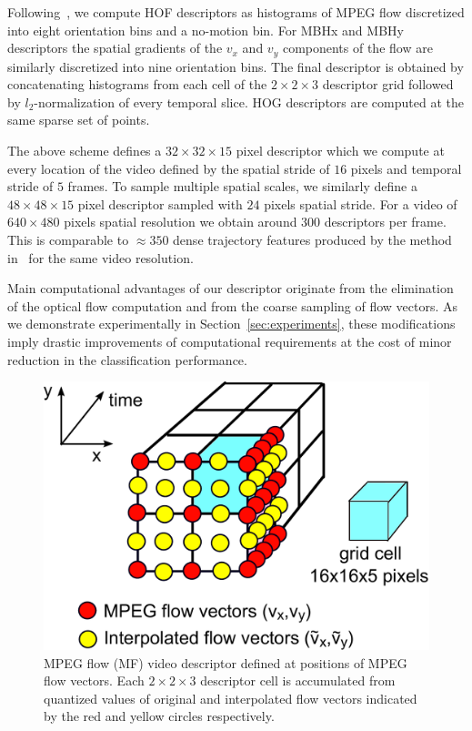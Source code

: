Following~\cite{Wang12}, we compute HOF descriptors as histograms of MPEG flow discretized into eight orientation bins and a no-motion bin. For MBHx and MBHy descriptors the spatial gradients of the $v_x$ and $v_y$ components of the flow are similarly discretized into nine orientation bins. %
The final descriptor is obtained by concatenating histograms from each cell of the $2\times2\times3$ descriptor grid followed by $l_2$-normalization of every temporal slice. HOG descriptors are computed at the same sparse set of points.

The above scheme defines a $32\times32\times15$ pixel descriptor which we compute at every location of the video defined by the spatial stride of $16$ pixels and temporal stride of $5$ frames. To sample multiple spatial scales, we similarly define a $48\times48\times15$ pixel descriptor sampled with $24$ pixels spatial stride. For a video of $640\times480$ pixels spatial resolution we obtain around 300 descriptors per frame. This is comparable to $\approx350$ dense trajectory features produced by the method in~\cite{Wang12} for the same video resolution.

Main computational advantages of our descriptor originate from the elimination of the optical flow computation and from the coarse sampling of flow vectors. As we demonstrate experimentally in Section~\ref{sec:experiments}, these modifications imply drastic improvements of computational requirements at the cost of minor reduction in the classification performance. 


\begin{figure}
\begin{center}
\includegraphics[width=.6\linewidth]{cvpr14_figures/CD-descriptor2.pdf}
\caption[MPEG flow video descriptor]{MPEG flow (MF) video descriptor defined at positions of MPEG flow vectors. Each $2\times2\times3$ descriptor cell is accumulated from quantized values of original and interpolated flow vectors indicated by the red and yellow circles respectively.\vspace{-.6cm}}
\label{fig:CDdescriptor}
\end{center}
\end{figure}


